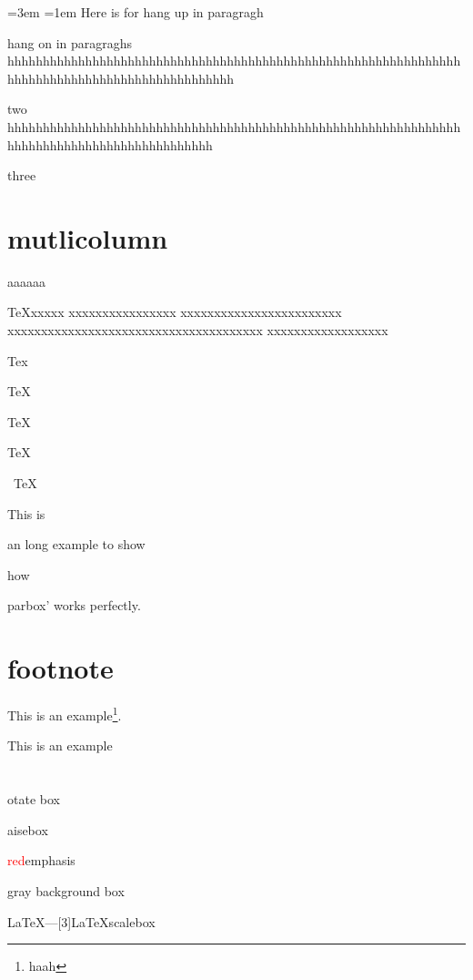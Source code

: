 \documentclass{article}
\begin{document}

{
\leftskip=3em
\parindent=1em
Here is for hang up in paragragh

hang on in paragraghs hhhhhhhhhhhhhhhhhhhhhhhhhhhhhhhhhhhhhhhhhhhhhhhhhhhhhhhhhhhhhhhhhhhhhhhhhhhhhhhhhhhhhhhhhhhhhhhh

two hhhhhhhhhhhhhhhhhhhhhhhhhhhhhhhhhhhhhhhhhhhhhhhhhhhhhhhhhhhhhhhhhhhhhhhhhhhhhhhhhhhhhhhhhhhhh

three

}

\section{mutlicolumn}

	aaa\hspace{.25\textwidth}aaa
	
	\parbox[t]{5em}{TeXxxxxx xxxxxxxxxxxxxxxx xxxxxxxxxxxxxxxxxxxxxxxx           xxxxxxxxxxxxxxxxxxxxxxxxxxxxxxxxxxxxxx xxxxxxxxxxxxxxxxxx\par Tex}
	\hfill
	\parbox[t]{0.2\linewidth}{TeX\smallskip\par TeX}
	\hfill
	\parbox[t]{0.2\linewidth}{TeX\bigskip\par\ TeX}


This is \parbox[t]{3.5em}{an long
example to show} how \parbox[b]
{4em}{parbox' works perfectly.}



\section{footnote}

This is an example\footnote{haah}.

\begin{minipage}{0.2\linewidth}
This is an example \footnotemark
{}
\end{minipage}

\section{}
otate box

aisebox

\textcolor{red}{red}emphasis

\colorbox[gray]{0.85}{gray background box}


\LaTeX---\scalebox{3}[3]{\LaTeX scalebox}



\end{document}
